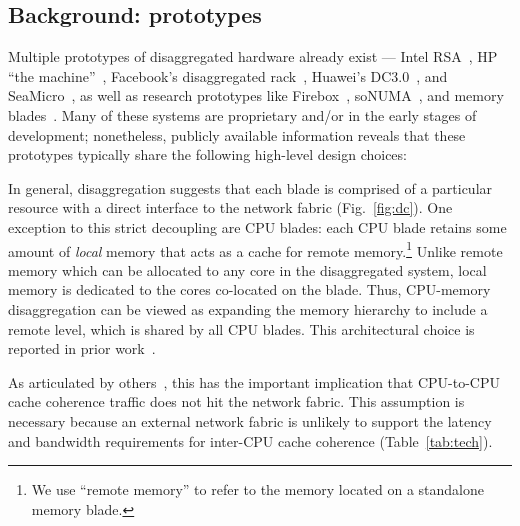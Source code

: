 \vspace{-0.1in}
\subsection{Background: \dis prototypes}
\vspace{-0.05in}
\label{ssec:prototype}
Multiple prototypes of disaggregated hardware already exist --- Intel RSA~\cite{rsa}, HP ``the machine''~\cite{hptm}, Facebook's disaggregated rack~\cite{fdr}, Huawei's DC3.0~\cite{huawei}, and SeaMicro~\cite{seamicro}, as well as research prototypes like Firebox~\cite{firebox}, soNUMA~\cite{sonuma}, and memory blades~\cite{ddcHwDesign1}. 
Many of these systems are proprietary and/or in the early stages of development; nonetheless, publicly available information reveals that these prototypes typically share the following high-level design choices: 
	
In general, disaggregation suggests that each blade is comprised of a particular resource with a direct interface to the network fabric (Fig.~\ref{fig:dc}). One exception to this strict decoupling are CPU blades: each CPU blade retains some amount of \emph{local} memory that acts as a cache for remote  memory.\footnote{We use ``remote memory'' to refer to the memory located on a standalone memory blade.} Unlike remote memory which can be allocated to any core in the disaggregated system, local memory is dedicated to the cores co-located on the blade.  Thus, CPU-memory disaggregation can be viewed as expanding the memory hierarchy to include a remote level, which is shared by all CPU blades. This architectural choice is reported in prior work~\cite{firebox, ddcHwDesign1, ddcHwDesign2, firebox, huawei}.
	
	
	

 As articulated by others~\cite{firebox,hptm,huawei}, this has the important implication that 
CPU-to-CPU cache coherence traffic does not hit the network fabric.
This assumption is necessary because an external network fabric is unlikely to support the latency and bandwidth requirements for inter-CPU cache coherence (Table~\ref{tab:tech}).




